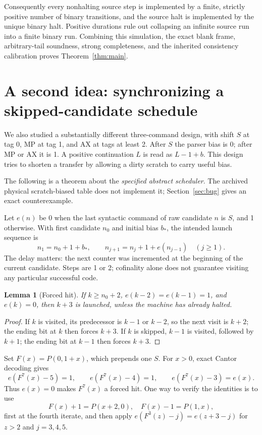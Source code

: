 \documentclass[11pt,a4paper]{article}
\newtheorem{lemma}[theorem]{Lemma}
\theoremstyle{remark}\newtheorem{remark}[theorem]{Remark}
\begin{document}
Consequently every nonhalting source step is implemented by a finite, strictly positive number of binary transitions, and the source halt is implemented by the unique binary halt. Positive durations rule out collapsing an infinite source run into a finite binary run. Combining this simulation, the exact blank frame, arbitrary-tail soundness, strong completeness, and the inherited consistency calibration proves Theorem~\ref{thm:main}.

\section{A second idea: synchronizing a skipped-candidate schedule}\label{sec:seven}

We also studied a substantially different three-command design, with shift $S$ at tag 0, MP at tag 1, and AX at tags at least 2. After $S$ the parser bias is 0; after MP or AX it is 1. A positive continuation $L$ is read as $L-1+b$. This design tries to shorten a transfer by allowing a dirty scratch to carry useful bias.

The following is a theorem about the \emph{specified abstract scheduler}. The archived physical scratch-biased table does not implement it; Section~\ref{sec:bug} gives an exact counterexample.

Let $e(n)$ be 0 when the last syntactic command of raw candidate $n$ is $S$, and 1 otherwise. With first candidate $n_0$ and initial bias $b_*$, the intended launch sequence is
\[
 n_1=n_0+1+b_*,\qquad n_{j+1}=n_j+1+e(n_{j-1})\quad(j\geq1).
\]
The delay matters: the next counter was incremented at the beginning of the current candidate. Steps are 1 or 2; cofinality alone does not guarantee visiting any particular successful code.

\begin{lemma}[Forced hit]
If $k\geq n_0+2$, $e(k-2)=e(k-1)=1$, and $e(k)=0$, then $k+3$ is launched, unless the machine has already halted.
\end{lemma}
\begin{proof}
If $k$ is visited, its predecessor is $k-1$ or $k-2$, so the next visit is $k+2$; the ending bit at $k$ then forces $k+3$. If $k$ is skipped, $k-1$ is visited, followed by $k+1$; the ending bit at $k-1$ then forces $k+3$.
\end{proof}

Set $F(x)=P(0,1+x)$, which prepends one $S$. For $x>0$, exact Cantor decoding gives
\[
 e(F^7(x)-5)=1,\qquad e(F^7(x)-4)=1,\qquad
 e(F^7(x)-3)=e(x).
\]
Thus $e(x)=0$ makes $F^7(x)$ a forced hit. One way to verify the identities is to use
\[
 F(x)+1=P(x+2,0),\quad F(x)-1=P(1,x),
\]
first at the fourth iterate, and then apply
$e(F^3(z)-j)=e(z+3-j)$ for $z>2$ and $j=3,4,5$.
\end{document}
